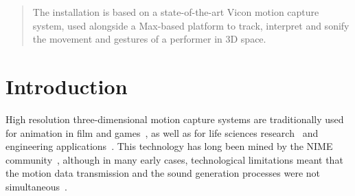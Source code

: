 \documentclass{nime-alternate}
\begin{document}
\maketitle
\begin{abstract}
	
	


 The installation is based on a state-of-the-art Vicon motion capture system, used alongside a Max-based platform to track, interpret and sonify the movement and gestures of a performer in 3D space.
\end{abstract}



 

\section{Introduction}





High resolution three-dimensional motion capture systems are traditionally used for animation in film and games~\cite{animatie}, as well as for life sciences research~\cite{life} and engineering applications~\cite{eng}. This technology has long been mined by the NIME community~\cite{dobrian2003gestural, nymoen2011soundsaber}, although in many early cases, technological limitations meant that the motion data transmission and the sound generation processes were not simultaneous~\cite{dobrian2003gestural, kapur2005framework}.
\end{document}
